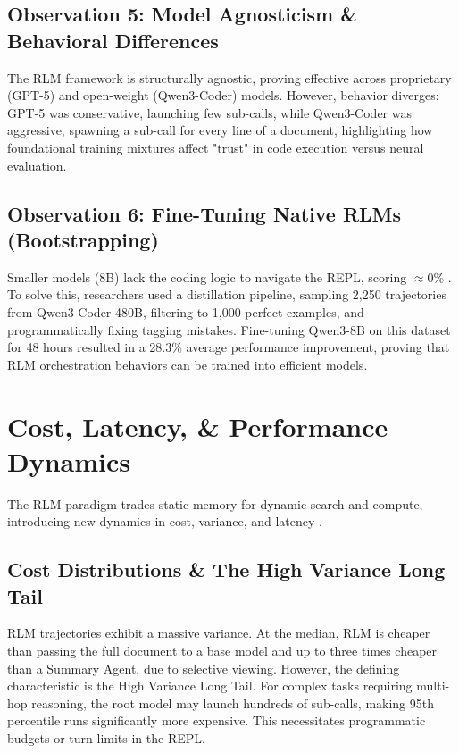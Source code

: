 \subsection{Observation 5: Model Agnosticism \& Behavioral Differences}
The RLM framework is structurally agnostic, proving effective across proprietary (GPT-5) and open-weight (Qwen3-Coder) models. However, behavior diverges: GPT-5 was conservative, launching few sub-calls, while Qwen3-Coder was aggressive, spawning a sub-call for every line of a document, highlighting how foundational training mixtures affect "trust" in code execution versus neural evaluation.


\subsection{Observation 6: Fine-Tuning Native RLMs (Bootstrapping)}
Smaller models (8B) lack the coding logic to navigate the REPL, scoring $\approx$0\% \cite{zelikman2022, deepseek2025}. To solve this, researchers used a distillation pipeline, sampling 2,250 trajectories from Qwen3-Coder-480B, filtering to 1,000 perfect examples, and programmatically fixing tagging mistakes. Fine-tuning Qwen3-8B on this dataset for 48 hours resulted in a 28.3\% average performance improvement, proving that RLM orchestration behaviors can be trained into efficient models.


\section{Cost, Latency, \& Performance Dynamics}
The RLM paradigm trades static memory for dynamic search and compute, introducing new dynamics in cost, variance, and latency \cite{zhang2025, wu2025}.

\subsection{Cost Distributions \& The High Variance Long Tail}
RLM trajectories exhibit a massive variance. At the median, RLM is cheaper than passing the full document to a base model and up to three times cheaper than a Summary Agent, due to selective viewing. However, the defining characteristic is the High Variance Long Tail. For complex tasks requiring multi-hop reasoning, the root model may launch hundreds of sub-calls, making 95th percentile runs significantly more expensive. This necessitates programmatic budgets or turn limits in the REPL.



